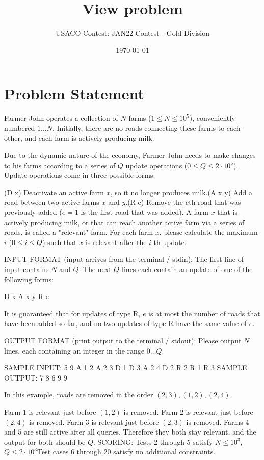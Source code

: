 \documentclass[12pt]{article}
\title{View problem}
\author{USACO Contest: JAN22 Contest - Gold Division}
\date{\today}
\begin{document}
\maketitle

\section*{Problem Statement}

Farmer John operates a collection of $N$ farms ($1\le N\le 10^5$), conveniently
numbered $1\ldots N$.  Initially, there are no roads connecting these farms to
each-other, and each farm is actively producing milk.

Due to the dynamic nature of the economy, Farmer John needs to make changes to
his farms according to a series of $Q$ update operations
($0\le Q\le 2\cdot 10^5$). Update operations come in three possible forms:

(D x) Deactivate an active farm $x$, so it no longer produces milk.(A x y) Add a road between two active farms $x$ and $y$.(R e) Remove the $e$th road that was previously added ($e = 1$ is the  first
road that was added).
A farm $x$ that is actively producing milk, or that can reach another active
farm via a series of roads, is called a "relevant" farm.  For each farm $x$,
please calculate the maximum $i$ ($0\le i\le Q$) such that $x$  is relevant
after the $i$-th update.

INPUT FORMAT (input arrives from the terminal / stdin):
The first line of input contains $N$ and $Q$.  The next $Q$ lines each contain an update of one of the following forms:


D x
A x y
R e

It is guaranteed that for updates of type R, $e$ is at most the number of roads
that have been added so far, and no two updates of type R have the same value of
$e$.

OUTPUT FORMAT (print output to the terminal / stdout):
Please output $N$ lines, each containing an integer in the range $0\ldots Q$.

SAMPLE INPUT:
5 9
A 1 2
A 2 3
D 1
D 3
A 2 4
D 2
R 2
R 1
R 3
SAMPLE OUTPUT: 
7
8
6
9
9

In this example, roads are removed in the order $(2,3), (1,2), (2,4)$. 

Farm $1$ is relevant just before $(1,2)$ is removed. Farm $2$ is relevant just before $(2,4)$ is removed. Farm $3$ is relevant just before $(2,3)$ is removed. Farms $4$ and $5$ are still active after all queries. Therefore they both
stay relevant, and the output for both should be $Q$.
SCORING:
Tests 2 through 5 satisfy $N\le 10^3$, $Q\le 2\cdot 10^3$Test cases 6 through 20 satisfy no additional constraints.
\end{document}

